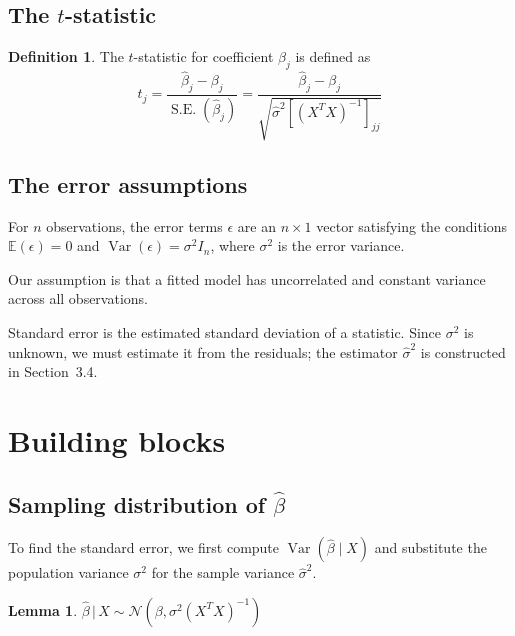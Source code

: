 \documentclass[11pt]{article}
\newtheorem{lemma}[theorem]{Lemma}
\theoremstyle{definition}
\newtheorem{definition}[theorem]{Definition}
\begin{document}
\subsection{The $t$-statistic}
\begin{definition}
    The $t$-statistic for coefficient $\beta_j$ is defined as
    $$t_j = \frac{\widehat{\beta}_j - \beta_j}{\operatorname{S.E.}(\widehat{\beta}_j)}
          = \frac{\widehat{\beta}_j - \beta_j}{\sqrt{\widehat{\sigma}^2 \left[(X^T X)^{-1}\right]_{jj}}}$$
\end{definition}
\subsection{The error assumptions}
For $n$ observations, the error terms $\epsilon$ are an $n \times 1$ vector satisfying the conditions 
$\mathbb{E}(\epsilon) = 0$ and $\operatorname{Var}(\epsilon) = \sigma^2 I_n$, where $\sigma^2$ is the error variance.

Our assumption is that a fitted model has uncorrelated and constant variance across all observations.

Standard error is the estimated standard deviation of a statistic. Since
$\sigma^2$ is unknown, we must estimate it from the residuals; the estimator
$\widehat{\sigma}^2$ is constructed in Section~3.4.

\section{Building blocks}

\subsection{Sampling distribution of $\widehat{\beta}$}
To find the standard error, we first compute $\operatorname{Var}(\widehat{\beta} \mid X)$ and substitute the population variance $\sigma^2$
for the sample variance $\widehat{\sigma}^2$.
\begin{lemma}\label{lem:beta-dist}
    $\widehat{\beta} \,|\, X \sim \mathcal{N}(\beta, \sigma^2 (X^T X)^{-1})$
\end{lemma}
\end{document}
